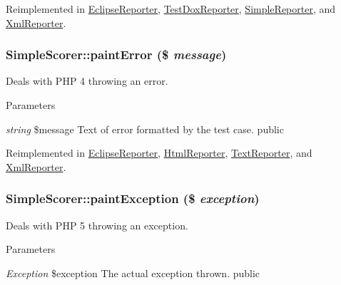 Reimplemented in \hyperlink{class_eclipse_reporter_a3417bc5902a1ca59ec14d64707cf15b2}{EclipseReporter}, \hyperlink{class_test_dox_reporter_a0675ceed8813548f9d1bafc71c794f24}{TestDoxReporter}, \hyperlink{class_simple_reporter_a987d5bbfa2cc927da394f6bc6053c23e}{SimpleReporter}, and \hyperlink{class_xml_reporter_aebd11df8a848fa3f5b2d0d1b725249c1}{XmlReporter}.\hypertarget{class_simple_scorer_ac33eeacd9e121f39874f95eec7219b88}{
\subsubsection[{paintError}]{\setlength{\rightskip}{0pt plus 5cm}SimpleScorer::paintError (\$ {\em message})}}
\label{class_simple_scorer_ac33eeacd9e121f39874f95eec7219b88}
Deals with PHP 4 throwing an error. 
\begin{DoxyParams}{Parameters}
\item[{\em string}]\$message Text of error formatted by the test case.  public \end{DoxyParams}


Reimplemented in \hyperlink{class_eclipse_reporter_a54b5dd27926ce2bed0e1d4886460fe47}{EclipseReporter}, \hyperlink{class_html_reporter_af6c7e574ee27fa12c6c9299aa6939727}{HtmlReporter}, \hyperlink{class_text_reporter_a1318de43ace9fbf493eef1aa6059c0da}{TextReporter}, and \hyperlink{class_xml_reporter_adf32d80f48cfbfc4dcad63397e45ca8d}{XmlReporter}.\hypertarget{class_simple_scorer_af85813652ea0ec8aca7261267c121f6c}{
\subsubsection[{paintException}]{\setlength{\rightskip}{0pt plus 5cm}SimpleScorer::paintException (\$ {\em exception})}}
\label{class_simple_scorer_af85813652ea0ec8aca7261267c121f6c}
Deals with PHP 5 throwing an exception. 
\begin{DoxyParams}{Parameters}
\item[{\em Exception}]\$exception The actual exception thrown.  public \end{DoxyParams}


